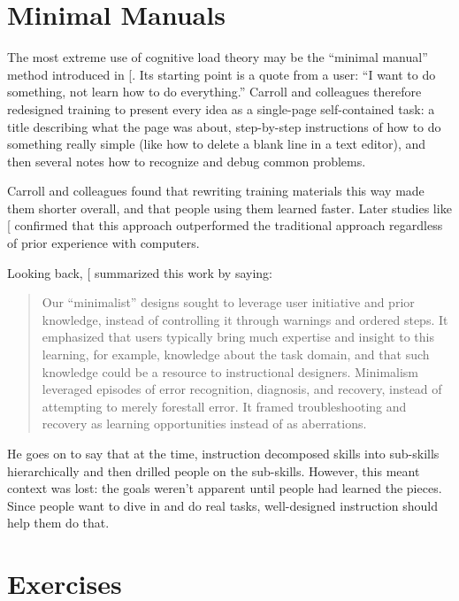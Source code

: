 \section{Minimal Manuals}\label{s:load-minimal}

The most extreme use of cognitive load theory may be the ``minimal
manual'' method introduced in {[}\protect[\hyperlink{b:Carr1987}{Carr1987}]{]}. Its starting point is
a quote from a user: ``I want to do something, not learn how to do
everything.'' Carroll and colleagues therefore redesigned training to
present every idea as a single-page self-contained task: a title
describing what the page was about, step-by-step instructions of how to
do something really simple (like how to delete a blank line in a text
editor), and then several notes how to recognize and debug common
problems.

Carroll and colleagues found that rewriting training materials this way
made them shorter overall, and that people using them learned faster.
Later studies like {[}\protect[\hyperlink{b:Lazo1993}{Lazo1993}]{]} confirmed that this approach
outperformed the traditional approach regardless of prior experience
with computers.

Looking back, {[}\protect[\hyperlink{b:Carr2014}{Carr2014}]{]} summarized this work by saying:

\begin{quote}\setlength{\parindent}{0pt}
Our ``minimalist'' designs sought to leverage user initiative and prior
knowledge, instead of controlling it through warnings and ordered
steps. It emphasized that users typically bring much expertise and
insight to this learning, for example, knowledge about the task
domain, and that such knowledge could be a resource to instructional
designers. Minimalism leveraged episodes of error recognition,
diagnosis, and recovery, instead of attempting to merely forestall
error. It framed troubleshooting and recovery as learning
opportunities instead of as aberrations.
\end{quote}

He goes on to say that at the time, instruction decomposed skills into
sub-skills hierarchically and then drilled people on the sub-skills.
However, this meant context was lost: the goals weren't apparent until
people had learned the pieces. Since people want to dive in and do real
tasks, well-designed instruction should help them do that.

\section{Exercises}\label{s:load-exercises}

